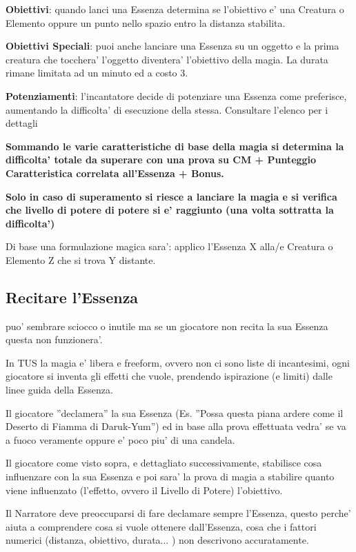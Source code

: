 \documentclass[a4paper,11pt,twoside,openany]{book}
\begin{document}
\textbf{Obiettivi}: quando lanci una Essenza determina se l'obiettivo e' una Creatura o Elemento oppure un punto nello spazio entro la distanza stabilita.

\textbf{Obiettivi Speciali}: puoi anche lanciare una Essenza su un oggetto e la prima creatura che tocchera' l'oggetto diventera' l'obiettivo della magia. La durata rimane limitata ad un minuto ed a costo 3.

\textbf{Potenziamenti}: l'incantatore decide di potenziare una Essenza come preferisce, aumentando la difficolta' di esecuzione della stessa. Consultare l'elenco per i dettagli

\textbf{Sommando le varie caratteristiche di base della magia si determina la difficolta' totale da superare con una prova su CM + Punteggio Caratteristica correlata all'Essenza + Bonus.}

\textbf{Solo in caso di superamento si riesce a lanciare la magia e si verifica che livello di potere di potere si e' raggiunto (una volta sottratta la difficolta')}

Di base una formulazione magica sara': applico l'Essenza X alla/e Creatura o Elemento Z che si trova Y distante.

\subsection{Recitare l'Essenza}

\label{recitare-lessenza}

puo' sembrare sciocco o inutile ma se un giocatore non recita la sua Essenza questa non funzionera'.

In TUS la magia e' libera e freeform, ovvero non ci sono liste di incantesimi, ogni giocatore si inventa gli effetti che vuole, prendendo ispirazione (e limiti) dalle linee guida della Essenza.

Il giocatore ''declamera'' la sua Essenza (Es. ''Possa questa piana ardere come il Deserto di Fiamma di Daruk-Yum'') ed in base alla prova effettuata vedra' se va a fuoco veramente oppure e' poco piu' di una candela.

Il giocatore come visto sopra, e dettagliato successivamente, stabilisce cosa influenzare con la sua Essenza e poi sara' la prova di magia a stabilire quanto viene influenzato (l'effetto, ovvero il Livello di Potere) l'obiettivo.

Il Narratore deve preoccuparsi di fare declamare sempre l'Essenza, questo perche' aiuta a comprendere cosa si vuole ottenere dall'Essenza, cosa che i fattori numerici (distanza, obiettivo, durata... ) non descrivono accuratamente.
\end{document}
